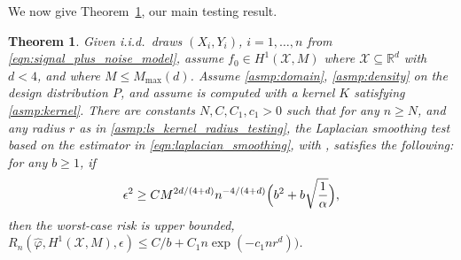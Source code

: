 \documentclass[twoside]{article}
\newcommand{\Reals}{\mathbb{R}}
\newcommand{\1}{\mathbf{1}}
\newcommand{\Rd}{\Reals^d}
\newcommand{\Xset}{\mathcal{X}}
\newcommand{\mc}[1]{\mathcal{#1}}
\newcommand{\wh}[1]{\widehat{#1}}
\newtheorem{theorem}{Theorem}
\theoremstyle{definition}
\theoremstyle{remark}
\begin{document}
We now give Theorem~\ref{thm:laplacian_smoothing_testing}, our main testing result.
\begin{theorem}
	\label{thm:laplacian_smoothing_testing}
	Given i.i.d.\ draws $(X_i,Y_i)$, $i=1,\ldots,n$ from \eqref{eqn:signal_plus_noise_model}, assume $f_0 \in H^1(\Xset,M)$ where $\Xset \subseteq \Rd$ with $d < 4$, and where $M \leq M_{\max}(d)$. Assume \ref{asmp:domain}, \ref{asmp:density} on the design distribution $P$, and assume  is computed with a kernel $K$ satisfying \ref{asmp:kernel}. There are constants $N,C,C_1,c_1>0$ such that for any $n \geq N$, and any radius $r$ as in \ref{asmp:ls_kernel_radius_testing}, the Laplacian smoothing test \smash{$\wh{\varphi}$} based on the estimator \smash{$\wh{f}$} in \eqref{eqn:laplacian_smoothing}, with , satisfies the following: for any $b \geq 1$, if
	\begin{equation}
	\label{eqn:laplacian_smoothing_testing}
	\epsilon^2 \geq C M^{2d/(4 + d)} n^{-4/(4 + d)}\Bigl(b^2 + b\sqrt{\frac{1}{\alpha}}\Bigr) ,
	\end{equation} 
	then the worst-case risk is upper bounded, $R_n(\wh{\varphi},H^1(\mc{X},M), \epsilon) \leq C/b + C_1n\exp(-c_1nr^d)\bigr)$.
\end{theorem}
\end{document}
